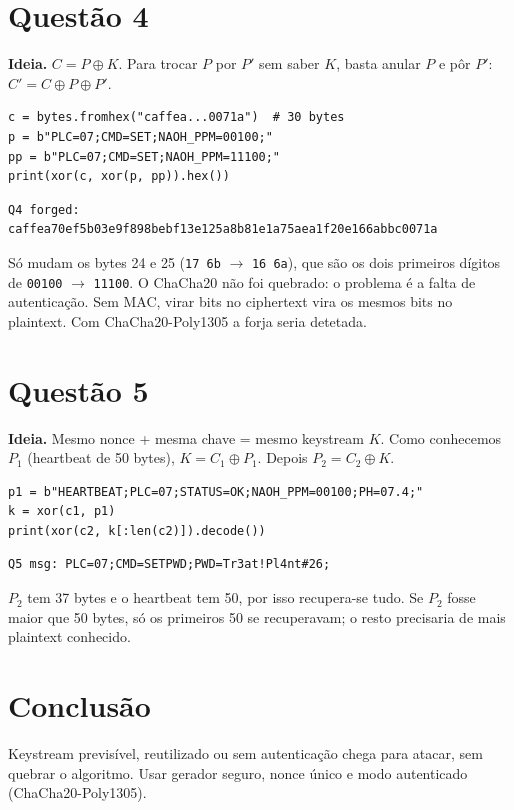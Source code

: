 \documentclass[11pt,a4paper]{article}
\begin{document}
\section*{Questão 4}

\textbf{Ideia.} $C = P \oplus K$. Para trocar $P$ por $P'$ sem saber $K$,
basta anular $P$ e pôr $P'$: $C' = C \oplus P \oplus P'$.

\begin{verbatim}
c = bytes.fromhex("caffea...0071a")  # 30 bytes
p = b"PLC=07;CMD=SET;NAOH_PPM=00100;"
pp = b"PLC=07;CMD=SET;NAOH_PPM=11100;"
print(xor(c, xor(p, pp)).hex())
\end{verbatim}

\begin{verbatim}
Q4 forged: caffea70ef5b03e9f898bebf13e125a8b81e1a75aea1f20e166abbc0071a
\end{verbatim}

Só mudam os bytes 24 e 25 (\texttt{17 6b} $\to$ \texttt{16 6a}), que são os
dois primeiros dígitos de \texttt{00100} $\to$ \texttt{11100}. O ChaCha20
não foi quebrado: o problema é a falta de autenticação. Sem MAC, virar bits
no ciphertext vira os mesmos bits no plaintext. Com ChaCha20-Poly1305 a
forja seria detetada.

\section*{Questão 5}

\textbf{Ideia.} Mesmo nonce + mesma chave = mesmo keystream $K$. Como
conhecemos $P_1$ (heartbeat de 50 bytes), $K = C_1 \oplus P_1$. Depois
$P_2 = C_2 \oplus K$.

\begin{verbatim}
p1 = b"HEARTBEAT;PLC=07;STATUS=OK;NAOH_PPM=00100;PH=07.4;"
k = xor(c1, p1)
print(xor(c2, k[:len(c2)]).decode())
\end{verbatim}

\begin{verbatim}
Q5 msg: PLC=07;CMD=SETPWD;PWD=Tr3at!Pl4nt#26;
\end{verbatim}

$P_2$ tem 37 bytes e o heartbeat tem 50, por isso recupera-se tudo. Se $P_2$
fosse maior que 50 bytes, só os primeiros 50 se recuperavam; o resto
precisaria de mais plaintext conhecido.

\section*{Conclusão}

Keystream previsível, reutilizado ou sem autenticação chega para atacar,
sem quebrar o algoritmo. Usar gerador seguro, nonce único e modo
autenticado (ChaCha20-Poly1305).
\end{document}

